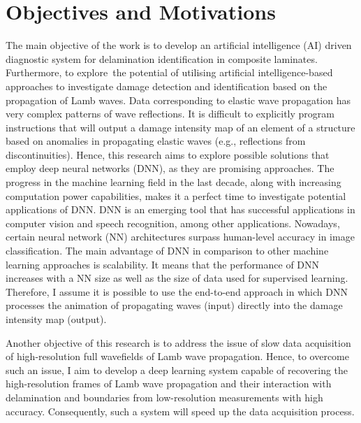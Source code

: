 \section{Objectives and Motivations}
\label{sec13}

The main objective of the work is to develop an artificial intelligence (AI) driven diagnostic system for delamination identification in composite laminates.
Furthermore, to explore the potential of utilising artificial intelligence-based approaches to investigate damage detection and identification based on the propagation of Lamb waves.
Data corresponding to elastic wave propagation has very complex patterns of wave reflections. 
It is difficult to explicitly program instructions that will output a damage intensity map of an element of a structure based on anomalies in propagating elastic waves (e.g., reflections from discontinuities).
Hence, this research aims to explore possible solutions that employ deep neural networks (DNN), as they are promising approaches.
The progress in the machine learning field in the last decade, along with increasing computation power capabilities, makes it a perfect time to investigate potential applications of DNN. 
DNN is an emerging tool that has successful applications in computer vision and speech recognition, among other applications. 
Nowadays, certain neural network (NN) architectures surpass human-level accuracy in image classification. 
The main advantage of DNN in comparison to other machine learning approaches is scalability. 
It means that the performance of DNN increases with a NN size as well as the size of data used for supervised learning. 
Therefore, I assume it is possible to use the end-to-end approach in which DNN processes the animation of propagating waves (input) directly into the damage intensity map (output).

Another objective of this research is to address the issue of slow data acquisition of high-resolution full wavefields of Lamb wave propagation.
Hence, to overcome such an issue, I aim to develop a deep learning system capable of recovering the high-resolution frames of Lamb wave propagation and their interaction with delamination and boundaries from low-resolution measurements with high accuracy.
Consequently, such a system will speed up the data acquisition process.


